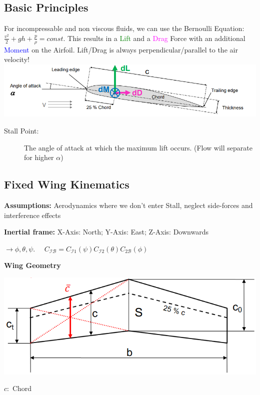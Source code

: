 \documentclass[fontsize=6pt,DIV=calc,a4paper,ngerman]{scrartcl}
\begin{document}
\begin{multicols*}{4}
	\subsection{Basic Principles}
	For incompressable and non viscous fluids, we can use the Bernoulli Equation:
	$\frac{v^2}{2}+gh+\frac{p}{\rho} = const.$
	This results in a \textcolor{green}{Lift} and a \textcolor{magenta}{Drag} Force with an additional \textcolor{blue}{Moment} on the Airfoil. Lift/Drag is always perpendicular/parallel to the air velocity!\\
	\includegraphics[width=\linewidth]{Aerodynamics.png}
	\begin{description}
		\item[Stall Point:] The angle of attack at which the maximum lift occurs. (Flow will separate for higher $\alpha$)
	\end{description}

	\subsection{Fixed Wing Kinematics}
	\textbf{Assumptions:}
		Aerodynamics where we don't enter Stall, neglect side-forces and interference effects

	\textbf{Inertial frame:} 
	X-Axis: North;
	Y-Axis: East;
	Z-Axis: Downwards

	$\rightarrow \phi, \theta,\psi$.
	$\quad C_\mathcal{IB} = C_{\mathcal{I}1}(\psi)C_{\mathcal{I}2}(\theta)C_{2\mathcal{B}}(\phi)$
	
	\textbf{Wing Geometry}

	\begin{minipage}{0.6\linewidth}
		\includegraphics[width=\linewidth]{wing_geo.png}
	\end{minipage}
	\begin{minipage}{0.4\linewidth}
		$c:$ Chord


\end{minipage}
\end{multicols*}
\end{document}
